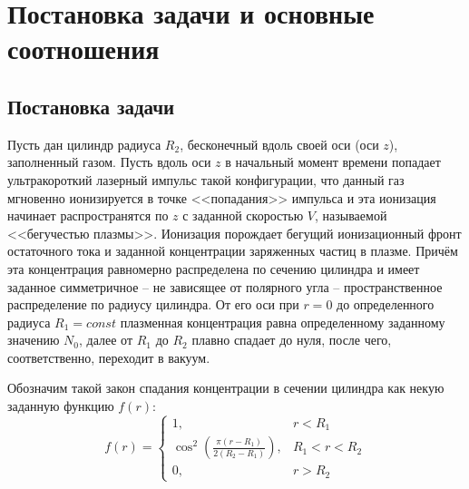 \documentclass[a4paper]{article}
\begin{document}
\newpage
\section{Постановка задачи и основные соотношения}
\subsection{Постановка задачи}

Пусть дан цилиндр радиуса $R_{2}$, бесконечный вдоль своей оси (оси $z$), заполненный газом. Пусть вдоль оси $z$ в начальный момент времени попадает ультракороткий лазерный импульс такой конфигурации, что данный газ мгновенно ионизируется в точке <<попадания>> импульса и эта ионизация начинает распространятся по $z$ с заданной скоростью $V$, называемой <<бегучестью плазмы>>. Ионизация порождает бегущий ионизационный фронт остаточного тока и заданной концентрации заряженных частиц в плазме. Причём эта концентрация равномерно распределена по сечению цилиндра и имеет заданное симметричное -- не зависящее от полярного угла -- пространственное распределение по радиусу цилиндра. От его оси при $r=0$ до определенного радиуса $R_{1}=const$ плазменная концентрация равна определенному заданному значению $N_{0}$, далее от $R_{1}$ до $R_{2}$ плавно спадает до нуля, после чего, соответственно, переходит в вакуум.

Обозначим такой закон спадания концентрации в сечении цилиндра как некую заданную функцию $f(r)$:
\begin{equation}
	f(r)=
	\begin{cases}
		1, & r<R_{1}\\
		\cos^{2}\left(\frac{\pi(r-R_{1})}{2(R_{2}-R_{1})}\right), & R_{1}<r<R_{2}\\
		0, & r>R_{2}
	\end{cases}			
	\label{eq:f(r)}
\end{equation}
\end{document}
